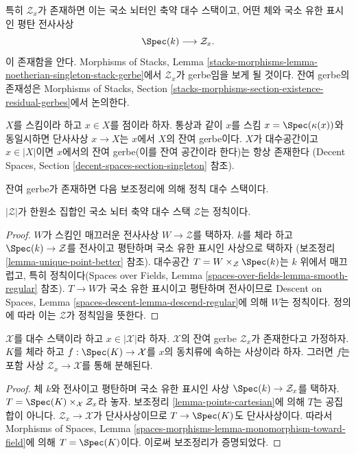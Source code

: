 \noindent
특히 $\mathcal{Z}_x$가 존재하면 이는 국소 뇌터인 축약 대수 스택이고,
어떤 체와 국소 유한 표시인 평탄 전사사상
$$
\Spec(k) \longrightarrow \mathcal{Z}_x.
$$
이 존재함을 안다. Morphisms of Stacks,
Lemma \ref{stacks-morphisms-lemma-noetherian-singleton-stack-gerbe}에서
$\mathcal{Z}_x$가 gerbe임을 보게 될 것이다. 잔여 gerbe의 존재성은
Morphisms of Stacks, Section
\ref{stacks-morphisms-section-existence-residual-gerbes}에서 논의한다.

\begin{example}
\label{example-residual-gerbe}
$X$를 스킴이라 하고 $x \in X$를 점이라 하자. 통상과 같이 $x$를
스킴 $x = \Spec(\kappa(x))$와 동일시하면 단사사상 $x \to X$는
$x$에서 $X$의 잔여 gerbe이다. $X$가 대수공간이고 $x \in |X|$이면
$x$에서의 잔여 gerbe(이를 잔여 공간이라 한다)는 항상 존재한다
(Decent Spaces, Section \ref{decent-spaces-section-singleton} 참조).
\end{example}

\noindent
잔여 gerbe가 존재하면 다음 보조정리에 의해 정칙 대수 스택이다.

\begin{lemma}
\label{lemma-residual-gerbe-regular}
$|\mathcal{Z}|$가 한원소 집합인 국소 뇌터 축약 대수 스택
$\mathcal{Z}$는 정칙이다.
\end{lemma}

\begin{proof}
$W$가 스킴인 매끄러운 전사사상 $W \to \mathcal{Z}$를 택하자.
$k$를 체라 하고 $\Spec(k) \to \mathcal{Z}$를 전사이고 평탄하며
국소 유한 표시인 사상으로 택하자
(보조정리 \ref{lemma-unique-point-better} 참조).
대수공간 $T = W \times_\mathcal{Z} \Spec(k)$는 $k$ 위에서 매끄럽고,
특히 정칙이다(Spaces over Fields,
Lemma \ref{spaces-over-fields-lemma-smooth-regular} 참조).
$T \to W$가 국소 유한 표시이고 평탄하며 전사이므로
Descent on Spaces, Lemma \ref{spaces-descent-lemma-descend-regular}에 의해
$W$는 정칙이다. 정의에 따라 이는 $\mathcal{Z}$가 정칙임을 뜻한다.
\end{proof}

\begin{lemma}
\label{lemma-residual-gerbe-points}
$\mathcal{X}$를 대수 스택이라 하고 $x \in |\mathcal{X}|$라 하자.
$\mathcal{X}$의 잔여 gerbe $\mathcal{Z}_x$가 존재한다고 가정하자.
$K$를 체라 하고 $f : \Spec(K) \to \mathcal{X}$를 $x$의 동치류에
속하는 사상이라 하자. 그러면 $f$는 포함 사상
$\mathcal{Z}_x \to \mathcal{X}$를 통해 분해된다.
\end{lemma}

\begin{proof}
체 $k$와 전사이고 평탄하며 국소 유한 표시인 사상
$\Spec(k) \to \mathcal{Z}_x$를 택하자.
$T = \Spec(K) \times_\mathcal{X} \mathcal{Z}_x$라 놓자.
보조정리 \ref{lemma-points-cartesian}에 의해 $T$는 공집합이 아니다.
$\mathcal{Z}_x \to \mathcal{X}$가 단사사상이므로
$T \to \Spec(K)$도 단사사상이다. 따라서 Morphisms of Spaces,
Lemma \ref{spaces-morphisms-lemma-monomorphism-toward-field}에 의해
$T = \Spec(K)$이다. 이로써 보조정리가 증명되었다.
\end{proof}

